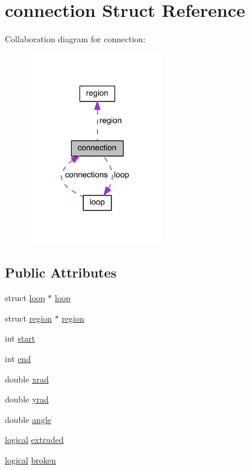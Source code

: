 \hypertarget{structconnection}{\section{connection Struct Reference}
\label{structconnection}
}


Collaboration diagram for connection\+:
\nopagebreak
\begin{figure}[H]
\begin{center}
\leavevmode
\includegraphics[width=165pt]{structconnection__coll__graph}
\end{center}
\end{figure}
\subsection*{Public Attributes}
\begin{DoxyCompactItemize}
\item 
struct \hyperlink{structloop}{loop} $\ast$ \hyperlink{structconnection_abcf2970e1b12e7ea857edae5790fadbb}{loop}
\item 
struct \hyperlink{structregion}{region} $\ast$ \hyperlink{structconnection_a571d9b8fe86ebe537ad0b5e052bdc70a}{region}
\item 
int \hyperlink{structconnection_af0bdfc181a339d06558a27aca2177f96}{start}
\item 
int \hyperlink{structconnection_a2eb3c7c7ea26ea070cd24284cb13baca}{end}
\item 
double \hyperlink{structconnection_ae93b041e3b4c184d0a155a2cfa8ffdea}{xrad}
\item 
double \hyperlink{structconnection_a2c32ebb1b452d1c8d3184f2bcfa23083}{yrad}
\item 
double \hyperlink{structconnection_a33fe62e9106d0de72fdffd1afa080257}{angle}
\item 
\hyperlink{naview_8c_aa2627246f9b7e4e41ceaa21c3ce4d035}{logical} \hyperlink{structconnection_ad108aaca045b991c8d6be924ada68fda}{extruded}
\item 
\hyperlink{naview_8c_aa2627246f9b7e4e41ceaa21c3ce4d035}{logical} \hyperlink{structconnection_a699addda10bad7552532d4f38aa00f1e}{broken}
\end{DoxyCompactItemize}


